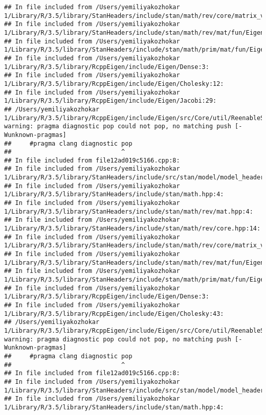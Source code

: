 \documentclass[]{article}
\begin{document}
\begin{verbatim}
## In file included from /Users/yemiliyakozhokar 1/Library/R/3.5/library/StanHeaders/include/stan/math/rev/core/matrix_vari.hpp:4:
## In file included from /Users/yemiliyakozhokar 1/Library/R/3.5/library/StanHeaders/include/stan/math/rev/mat/fun/Eigen_NumTraits.hpp:4:
## In file included from /Users/yemiliyakozhokar 1/Library/R/3.5/library/StanHeaders/include/stan/math/prim/mat/fun/Eigen.hpp:4:
## In file included from /Users/yemiliyakozhokar 1/Library/R/3.5/library/RcppEigen/include/Eigen/Dense:3:
## In file included from /Users/yemiliyakozhokar 1/Library/R/3.5/library/RcppEigen/include/Eigen/Cholesky:12:
## In file included from /Users/yemiliyakozhokar 1/Library/R/3.5/library/RcppEigen/include/Eigen/Jacobi:29:
## /Users/yemiliyakozhokar 1/Library/R/3.5/library/RcppEigen/include/Eigen/src/Core/util/ReenableStupidWarnings.h:10:30: warning: pragma diagnostic pop could not pop, no matching push [-Wunknown-pragmas]
##     #pragma clang diagnostic pop
##                              ^
## In file included from file12ad019c5166.cpp:8:
## In file included from /Users/yemiliyakozhokar 1/Library/R/3.5/library/StanHeaders/include/src/stan/model/model_header.hpp:4:
## In file included from /Users/yemiliyakozhokar 1/Library/R/3.5/library/StanHeaders/include/stan/math.hpp:4:
## In file included from /Users/yemiliyakozhokar 1/Library/R/3.5/library/StanHeaders/include/stan/math/rev/mat.hpp:4:
## In file included from /Users/yemiliyakozhokar 1/Library/R/3.5/library/StanHeaders/include/stan/math/rev/core.hpp:14:
## In file included from /Users/yemiliyakozhokar 1/Library/R/3.5/library/StanHeaders/include/stan/math/rev/core/matrix_vari.hpp:4:
## In file included from /Users/yemiliyakozhokar 1/Library/R/3.5/library/StanHeaders/include/stan/math/rev/mat/fun/Eigen_NumTraits.hpp:4:
## In file included from /Users/yemiliyakozhokar 1/Library/R/3.5/library/StanHeaders/include/stan/math/prim/mat/fun/Eigen.hpp:4:
## In file included from /Users/yemiliyakozhokar 1/Library/R/3.5/library/RcppEigen/include/Eigen/Dense:3:
## In file included from /Users/yemiliyakozhokar 1/Library/R/3.5/library/RcppEigen/include/Eigen/Cholesky:43:
## /Users/yemiliyakozhokar 1/Library/R/3.5/library/RcppEigen/include/Eigen/src/Core/util/ReenableStupidWarnings.h:10:30: warning: pragma diagnostic pop could not pop, no matching push [-Wunknown-pragmas]
##     #pragma clang diagnostic pop
##                              ^
## In file included from file12ad019c5166.cpp:8:
## In file included from /Users/yemiliyakozhokar 1/Library/R/3.5/library/StanHeaders/include/src/stan/model/model_header.hpp:4:
## In file included from /Users/yemiliyakozhokar 1/Library/R/3.5/library/StanHeaders/include/stan/math.hpp:4:

\end{verbatim}
\end{document}
